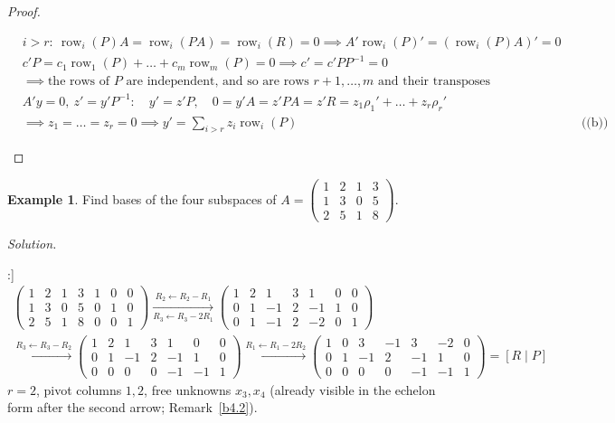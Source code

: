 \documentclass[12pt]{article}
\theoremstyle{definition}
\newtheorem{example}[theorem]{Example}
\newcommand{\boardtop}{\vspace*{-\abovedisplayskip}}
\DeclareMathOperator{\row}{row}
\begin{document}
\begin{proof}
\begin{board}
\boardtop
\begin{align*}
&i>r:\ \row_i(P)A=\row_i(PA)=\row_i(R)=0\implies A'\row_i(P)'=(\row_i(P)A)'=0\\
&c'P=c_1\row_1(P)+\dots+c_m\row_m(P)=0\implies c'=c'PP^{-1}=0\\
&\implies\text{the rows of }P\text{ are independent, and so are rows }r+1,\dots,m\text{ and their transposes}\\
&A'y=0,\ z'=y'P^{-1}:\quad y'=z'P,\quad0=y'A=z'PA=z'R=z_1\rho_1'+\dots+z_r\rho_r'\\
&\implies z_1=\dots=z_r=0\implies y'=\textstyle\sum_{i>r}z_i\row_i(P)&&\text{((b))}
\end{align*}
\end{board}
\nopagebreak
\end{proof}

\begin{example}\label{b4.9}
Find bases of the four subspaces of
\(A=\left(\begin{smallmatrix}1&2&1&3\\1&3&0&5\\2&5&1&8\end{smallmatrix}\right)\).
\end{example}
\textit{Solution.}
\begin{board}[Row-reduce \([A\mid I_3]\):]
\[
\begin{gathered}
\left(\begin{array}{cccc|ccc}1&2&1&3&1&0&0\\1&3&0&5&0&1&0\\2&5&1&8&0&0&1\end{array}\right)
\xrightarrow[R_3\leftarrow R_3-2R_1]{R_2\leftarrow R_2-R_1}
\left(\begin{array}{cccc|ccc}1&2&1&3&1&0&0\\0&1&-1&2&-1&1&0\\0&1&-1&2&-2&0&1\end{array}\right)
\\
\xrightarrow{R_3\leftarrow R_3-R_2}
\left(\begin{array}{cccc|ccc}1&2&1&3&1&0&0\\0&1&-1&2&-1&1&0\\0&0&0&0&-1&-1&1\end{array}\right)
\xrightarrow{R_1\leftarrow R_1-2R_2}
\left(\begin{array}{cccc|ccc}1&0&3&-1&3&-2&0\\0&1&-1&2&-1&1&0\\0&0&0&0&-1&-1&1\end{array}\right)
=[R\mid P]
\end{gathered}
\]
\(r=2\), pivot columns \(1,2\), free unknowns \(x_3,x_4\) (already visible in the echelon form after the second arrow;
Remark~\ref{b4.2}).
\end{board}
\end{document}
